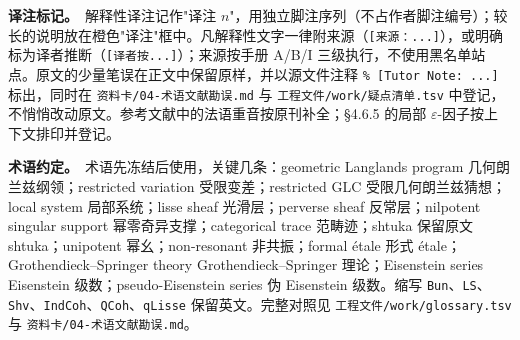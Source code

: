 \documentclass[UTF8, a4paper, 12pt, fontset=fandol, scheme=chinese]{ctexart}
\begin{document}
\textbf{译注标记。}\ 解释性译注记作"译注 $n$"，用独立脚注序列（不占作者脚注编号）；较长的说明放在橙色"译注"框中。凡解释性文字一律附来源（\verb|[来源：...]|），或明确标为译者推断（\verb|[译者按...]|）；来源按手册 A/B/I 三级执行，不使用黑名单站点。原文的少量笔误在正文中保留原样，并以源文件注释 \verb|% [Tutor Note: ...]| 标出，同时在 \verb|资料卡/04-术语文献勘误.md| 与 \verb|工程文件/work/疑点清单.tsv| 中登记，不悄悄改动原文。参考文献中的法语重音按原刊补全；§4.6.5 的局部 $\varepsilon$-因子按上下文排印并登记。

\textbf{术语约定。}\ 术语先冻结后使用，关键几条：geometric Langlands program 几何朗兰兹纲领；restricted variation 受限变差；restricted GLC 受限几何朗兰兹猜想；local system 局部系统；lisse sheaf 光滑层；perverse sheaf 反常层；nilpotent singular support 幂零奇异支撑；categorical trace 范畴迹；shtuka 保留原文 shtuka；unipotent 幂幺；non-resonant 非共振；formal étale 形式 étale；Grothendieck--Springer theory Grothendieck--Springer 理论；Eisenstein series Eisenstein 级数；pseudo-Eisenstein series 伪 Eisenstein 级数。缩写 \verb|Bun|、\verb|LS|、\verb|Shv|、\verb|IndCoh|、\verb|QCoh|、\verb|qLisse| 保留英文。完整对照见 \verb|工程文件/work/glossary.tsv| 与 \verb|资料卡/04-术语文献勘误.md|。

\newpage
\tableofcontents
\newpage














\end{document}
